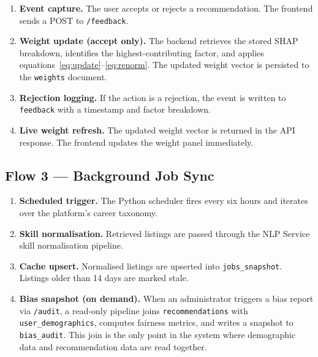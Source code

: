 \begin{enumerate}
  \item \textbf{Event capture.} The user accepts or rejects a recommendation.
        The frontend sends a POST to \texttt{/feedback}.

  \item \textbf{Weight update (accept only).} The backend retrieves the stored
        SHAP breakdown, identifies the highest-contributing factor, and applies
        equations~\eqref{eq:update}--\eqref{eq:renorm}. The updated weight
        vector is persisted to the \texttt{weights} document.

  \item \textbf{Rejection logging.} If the action is a rejection, the event is
        written to \texttt{feedback} with a timestamp and factor breakdown.

  \item \textbf{Live weight refresh.} The updated weight vector is returned in
        the API response. The frontend updates the weight panel immediately.
\end{enumerate}

\subsection*{Flow 3 --- Background Job Sync}

\begin{enumerate}
  \item \textbf{Scheduled trigger.} The Python scheduler fires every six hours
        and iterates over the platform's career taxonomy.

  \item \textbf{Skill normalisation.} Retrieved listings are passed through
        the NLP Service skill normalisation pipeline.

  \item \textbf{Cache upsert.} Normalised listings are upserted into
        \texttt{jobs\_snapshot}. Listings older than 14 days are marked stale.

  \item \textbf{Bias snapshot (on demand).} When an administrator triggers a
        bias report via \texttt{/audit}, a read-only pipeline joins
        \texttt{recommendations} with \texttt{user\_demographics}, computes
        fairness metrics, and writes a snapshot to \texttt{bias\_audit}. This
        join is the only point in the system where demographic data and
        recommendation data are read together.
\end{enumerate}

